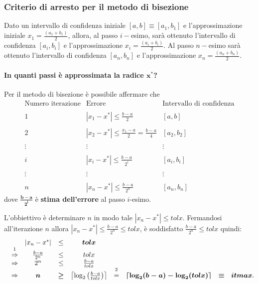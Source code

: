 \subsubsection{Criterio di arresto per il metodo di bisezione} Dato un intervallo di confidenza iniziale $[a,b]\equiv [a_1,b_1]$ e l'approssimazione iniziale $x_1=\frac{(a_1+b_1)}{2}$, allora, al passo $i-$esimo, sarà ottenuto l'intervallo di confidenza $[a_i,b_i]$ e l'approssimazione $x_i=\frac{(a_i+b_i)}{2}$. Al passo $n-$esimo sarà ottenuto l'intervallo di confidenza $[a_n,b_n]$ e l'approssimazione $x_n=\frac{(a_n+b_n)}{2}$.

\paragraph{In quanti passi è approssimata la radice $\boldsymbol{x^*}$?}
Per il metodo di bisezione è possibile affermare che
\begin{equation*}
	\begin{matrix}
		\text{Numero iterazione} & \text{Errore} & \text{Intervallo di confidenza}\\\\
		1 & |x_1-x^*| \leq \frac{b-a}{2} & [a,b] \\\\
		2 & |x_2-x^*|\leq \frac{x_1-a}{2}=\frac{b-a}{4}  & [a_2,b_2]\\\\
		\vdots & \vdots & \vdots \\\\
		i & |x_i-x^*|\leq\frac{b-a}{2^i} & [a_i,b_i]\\\\
		\vdots & \vdots & \vdots \\\\
		n & |x_n-x^*|\leq\frac{b-a}{2^n} & [a_n,b_n]
	\end{matrix}
\end{equation*}
dove $\boldsymbol{\frac{b-a}{2^i}}$ è \textbf{stima dell'errore} al passo $i$-esimo.

L'obbiettivo è determinare $n$ in modo tale $|x_n-x^*|\leq tolx$. Fermandosi all'iterazione $n$ allora $|x_n-x^*|\leq\frac{b-a}{2^n}\leq tolx$, è soddisfatto $\frac{b-a}{2^n}\leq tolx$ quindi:
\begin{equation*}
	\begin{matrix}
		&& |x_n-x^*| &\leq& \boldsymbol{tolx}\\
		&\overset{\footnotemark}{\Rightarrow}&\frac{b-a}{2^n}&\leq& tolx \\
		&\Rightarrow& 2^n&\leq&\frac{b-a}{tolx}\\
		&\Rightarrow& \boldsymbol n &\boldsymbol\geq&\left\lceil \log_{2}\left(\frac{b-a}{tolx}\right)\right\rceil&\overset{\footnotemark}{=}&\boldsymbol{\lceil \log_{2}(b-a)-\log_{2}(tolx)\rceil}&\boldsymbol\equiv& \boldsymbol{itmax}.
	\end{matrix}
\end{equation*}


